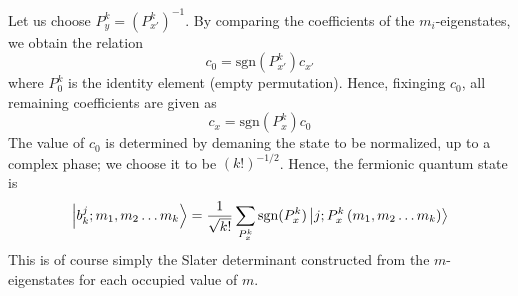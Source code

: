 \documentclass[12pt]{article}
\newcommand{\sgn}{\text{sgn}}
\begin{document}
	Let us choose $P^k_y=\left(P^k_{x'}\right)^{-1}$. By comparing the coefficients of the $m_i$-eigenstates, we obtain the relation
	$$c_0=\sgn(P^k_{x'})c_{x'}$$
	where $P^k_0$ is the identity element (empty permutation). 	Hence, fixinging $c_0$, all remaining coefficients are given as
	$$c_x=\sgn(P^k_x)c_0$$
	The value of $c_0$ is determined by demaning the state to be normalized, up to a complex phase; we choose it to be $(k!)^{-1/2}$. Hence, the fermionic quantum state is
	\begin{equation} \label{slater_determinant}
	\ket{b^j_k; m_1, m_2\dots m_k}=\frac{1}{\sqrt{k!}}\sum_{P^k_x}\sgn(P^k_x)\ket{j; P^k_x\left(m_1, m_2\dots m_k\right)}
	\end{equation}
	This is of course simply the Slater determinant constructed from the $m$-eigenstates for each occupied value of $m$.
	
\end{document}
